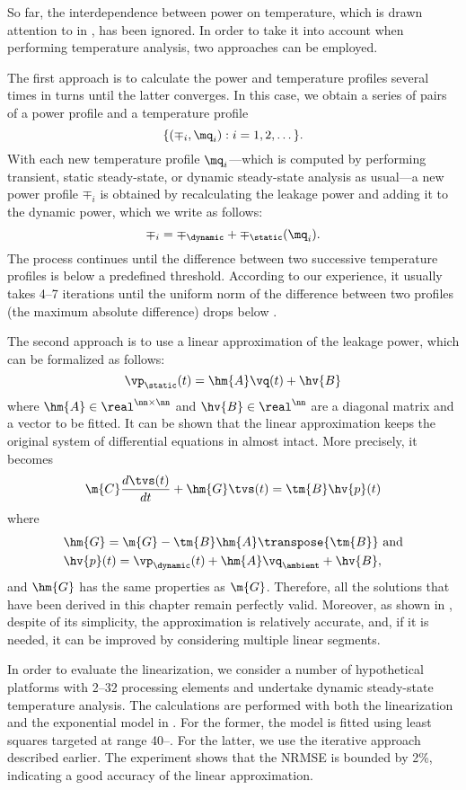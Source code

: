 So far, the interdependence between power on temperature, which is drawn
attention to in , has been ignored. In order to take it into
account when performing temperature analysis, two approaches can be employed.

The first approach is to calculate the power and temperature profiles several
times in turns until the latter converges. In this case, we obtain a series of
pairs of a power profile and a temperature profile
\[
  \{ (\mp_i, \mq_i): i = 1, 2, \dots \}.
\]
With each new temperature profile $\mq_i$---which is computed by performing
transient, static steady-state, or dynamic steady-state analysis as usual---a
new power profile $\mp_i$ is obtained by recalculating the leakage power and
adding it to the dynamic power, which we write as follows:
\[
  \mp_i = \mp_\dynamic + \mp_\static(\mq_i).
\]
The process continues until the difference between two successive temperature
profiles is below a predefined threshold. According to our experience, it
usually takes 4--7 iterations until the uniform norm of the difference between
two profiles (the maximum absolute difference) drops below .

The second approach is to use a linear approximation of the leakage power, which
can be formalized as follows:
\[
  \vp_\static(t) = \hm{A} \vq(t) + \hv{B}
\]
where $\hm{A} \in \real^{\nn \times \nn}$ and $\hv{B} \in \real^\nn$ are a
diagonal matrix and a vector to be fitted. It can be shown that the linear
approximation keeps the original system of differential equations in
 almost intact. More precisely, it
becomes
\[
  \m{C} \frac{d\tvs(t)}{dt} + \hm{G} \tvs(t) = \tm{B} \hv{p}(t)
\]
where
\begin{align*}
  & \hm{G} = \m{G} - \tm{B} \hm{A} \transpose{\tm{B}} \text{ and} \\
  & \hv{p}(t) = \vp_\dynamic(t) + \hm{A} \vq_\ambient + \hv{B},
\end{align*}
and $\hm{G}$ has the same properties as $\m{G}$. Therefore, all the solutions
that have been derived in this chapter remain perfectly valid. Moreover, as
shown in \cite{liu2007}, despite of its simplicity, the approximation is
relatively accurate, and, if it is needed, it can be improved by considering
multiple linear segments.

In order to evaluate the linearization, we consider a number of hypothetical
platforms with 2--32 processing elements and undertake dynamic steady-state
temperature analysis. The calculations are performed with both the linearization
and the exponential model in . For the former, the model is
fitted using least squares \cite{press2007} targeted at range 40--.
For the latter, we use the iterative approach described earlier. The experiment
shows that the \ac{NRMSE} is bounded by 2\%, indicating a good accuracy of the
linear approximation.

